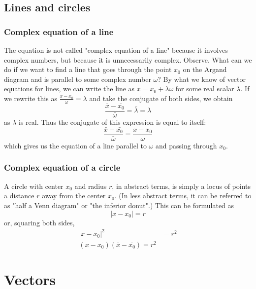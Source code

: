 \documentclass{article}
\begin{document}
\subsection{Lines and circles}
\subsubsection{Complex equation of a line}
The equation is not called "complex equation of a line" because it involves complex numbers, but because it is unnecessarily complex. Observe. What can we do if we want to find a line that goes through the point $x_0$ on the Argand diagram and is parallel to some complex number $\omega$? By what we know of vector equations for lines, we can write the line as $x = x_0 + \lambda \omega$ for some real scalar $\lambda$. If we rewrite this as $\frac{x-x_0}{\omega}=\lambda$ and take the conjugate of both sides, we obtain
\begin{equation*}
    \frac{\bar{x}-\bar{x_0}}{\bar{\omega}}=\bar{\lambda}=\lambda
\end{equation*}
as $\lambda$ is real. Thus the conjugate of this expression is equal to itself:
\begin{equation*}
    \frac{\bar{x}-\bar{x_0}}{\bar{\omega}}=\frac{x-x_0}{\omega}
\end{equation*}
which gives us the equation of a line parallel to $\omega$ and passing through $x_0$. 
\subsubsection{Complex equation of a circle}
A circle with center $x_0$ and radius $r$, in abstract terms, is simply a locus of points a distance $r$ away from the center $x_0$. (In less abstract terms, it can be referred to as "half a Venn diagram" or "the inferior donut".) This can be formulated as 
\begin{equation*}
    |x-x_0|=r
\end{equation*}
or, squaring both sides,
\begin{equation*}
    \begin{aligned}
        |x-x_0|^2&=r^2 \\
        (x-x_0)(\bar{x}-\bar{x_0})=r^2
    \end{aligned}
\end{equation*}
\section{Vectors}
\end{document}
